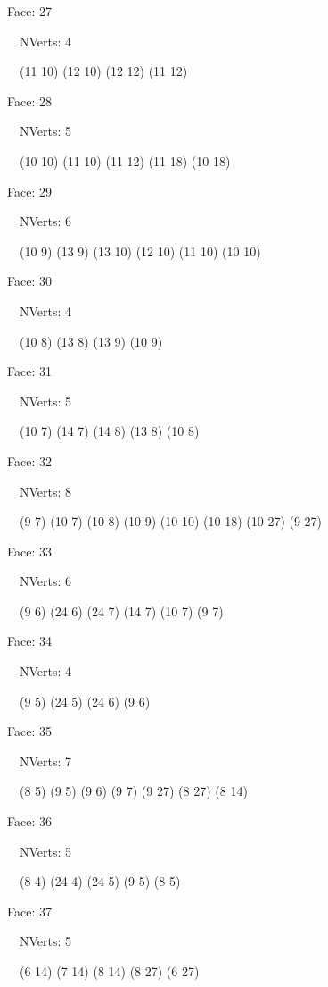 \documentclass{article}
\begin{document}
{\footnotesize 

Face: 27

\   \    NVerts: 4

 \   \   (11 10) (12 10) (12 12) (11 12)}

{\footnotesize 

Face: 28

\   \    NVerts: 5

 \   \   (10 10) (11 10) (11 12) (11 18) (10 18)}

{\footnotesize 

Face: 29

\   \    NVerts: 6

 \   \   (10 9) (13 9) (13 10) (12 10) (11 10) (10 10)}

{\footnotesize 

Face: 30

\   \    NVerts: 4

 \   \   (10 8) (13 8) (13 9) (10 9)}

{\footnotesize 

Face: 31

\   \    NVerts: 5

 \   \   (10 7) (14 7) (14 8) (13 8) (10 8)}

{\footnotesize 

Face: 32

\   \    NVerts: 8

 \   \   (9 7) (10 7) (10 8) (10 9) (10 10) (10 18) (10 27) (9 27)}

{\footnotesize 

Face: 33

\   \    NVerts: 6

 \   \   (9 6) (24 6) (24 7) (14 7) (10 7) (9 7)}

{\footnotesize 

Face: 34

\   \    NVerts: 4

 \   \   (9 5) (24 5) (24 6) (9 6)}

{\footnotesize 

Face: 35

\   \    NVerts: 7

 \   \   (8 5) (9 5) (9 6) (9 7) (9 27) (8 27) (8 14)}

{\footnotesize 

Face: 36

\   \    NVerts: 5

 \   \   (8 4) (24 4) (24 5) (9 5) (8 5)}

{\footnotesize 

Face: 37

\   \    NVerts: 5

 \   \   (6 14) (7 14) (8 14) (8 27) (6 27)}
\end{document}
